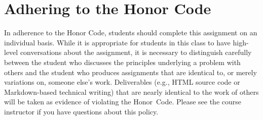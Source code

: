 \documentclass[11pt]{article}
\begin{document}
\section*{Adhering to the Honor Code}

In adherence to the Honor Code, students should complete this assignment on an individual basis. While it is appropriate
for students in this class to have high-level conversations about the assignment, it is necessary to distinguish
carefully between the student who discusses the principles underlying a problem with others and the student who produces
assignments that are identical to, or merely variations on, someone else's work. Deliverables (e.g., HTML source code or
Markdown-based technical writing) that are nearly identical to the work of others will be taken as evidence of violating
the \mbox{Honor Code}. Please see the course instructor if you have questions about this policy.
\end{document}
